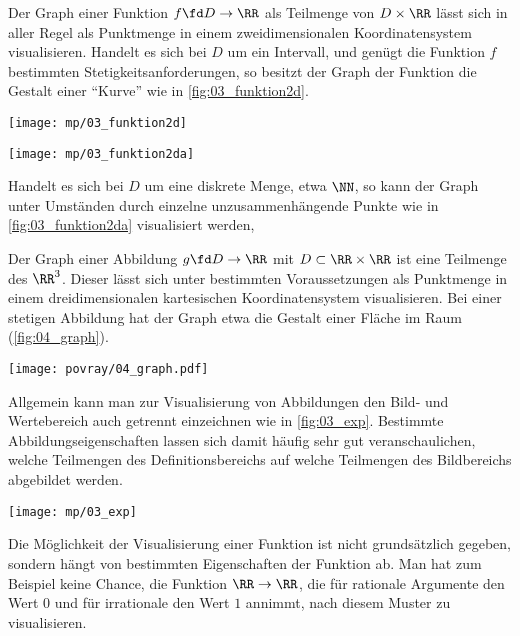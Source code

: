 \begin{antwort}
  Der Graph einer Funktion $f\fd D\to \RR$ 
  als Teilmenge von $D\times \RR$ lässt sich 
  in aller Regel als Punktmenge 
  in einem zweidimensionalen Koordinatensystem visualisieren. Handelt es 
  sich bei $D$ um ein Intervall, und genügt die Funktion $f$ bestimmten 
  Stetigkeitsanforderungen, so besitzt der Graph der Funktion die Gestalt 
  einer "`Kurve"' wie in \Abb\ref{fig:03_funktion2d}. 

  \begin{center}
    \begin{minipage}{60mm}
      \texttt{[image: mp/03\_funktion2d]}
      \label{fig:03_funktion2d}
    \end{minipage}
    \qquad
    \begin{minipage}{60mm}
      \texttt{[image: mp/03\_funktion2da]}
      \label{fig:03_funktion2da}
    \end{minipage}
  \end{center}

  Handelt es sich bei $D$ um eine diskrete Menge, etwa 
  $\NN$, so kann der Graph unter Umständen 
  durch einzelne unzusammenhängende Punkte 
  wie in \Abb\ref{fig:03_funktion2da} visualisiert werden, 
  
  Der Graph einer Abbildung $g\fd D\to \RR$ mit 
  $D\subset \RR \times \RR$ ist eine Teilmenge des 
  $\RR^3$. Dieser lässt sich 
  unter bestimmten Voraussetzungen als Punktmenge in einem 
  dreidimensionalen kartesischen Koordinatensystem visualisieren. 
  Bei einer stetigen Abbildung hat der Graph etwa die Gestalt einer 
  Fläche im Raum (\sieheAbbildung\ref{fig:04_graph}).

  \begin{center}
    \texttt{[image: povray/04\_graph.pdf]}
    \label{fig:04_graph}
  \end{center}

  Allgemein kann man zur Visualisierung von Abbildungen den Bild- und 
  Wertebereich auch getrennt einzeichnen wie in \Abb\ref{fig:03_exp}. Bestimmte   
  Abbildungseigenschaften 
  lassen sich damit häufig sehr gut veranschaulichen, {\zB} welche 
  Teilmengen des Definitionsbereichs auf welche Teilmengen des Bildbereichs 
  abgebildet werden.  

  \begin{center}
    \texttt{[image: mp/03\_exp]}
    \label{fig:03_exp}
  \end{center}

  Die Möglichkeit der Visualisierung einer Funktion ist nicht 
  grundsätzlich gegeben, sondern hängt von bestimmten Eigenschaften der 
  Funktion ab. Man hat zum Beispiel keine Chance, die Funktion 
  $\RR \to \RR$, die für rationale Argumente den Wert $0$ und für irrationale 
  den Wert $1$ annimmt, nach diesem Muster zu visualisieren.
  \AntEnd
\end{antwort}

